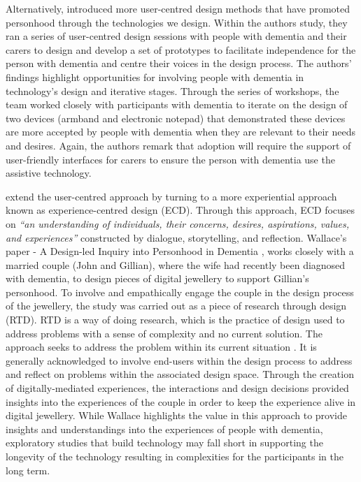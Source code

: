 Alternatively, \cite{robinson2009keeping} introduced more user-centred design methods that have promoted personhood through the technologies we design. Within the authors study, they ran a series of user-centred design sessions with people with dementia and their carers to design and develop a set of prototypes to facilitate independence for the person with dementia and centre their voices in the design process. The authors' findings highlight opportunities for involving people with dementia in technology's design and iterative stages. Through the series of workshops, the team worked closely with participants with dementia to iterate on the design of two devices (armband and electronic notepad) that demonstrated these devices are more accepted by people with dementia when they are relevant to their needs and desires. Again, the authors  remark that adoption will require the support of user-friendly interfaces for carers to ensure the person with dementia use the assistive technology. 

\cite{wallace_design-led_2013} extend the user-centred approach by turning to a more experiential approach known as experience-centred design (ECD). Through this approach, ECD focuses on \textit{``an understanding of individuals, their concerns, desires, aspirations, values, and experiences''} \citep{morrissey_value_2017} constructed by dialogue, storytelling, and reflection. Wallace's paper - A Design-led Inquiry into Personhood in Dementia \citep{wallace_design-led_2013}, works closely with a married couple (John and Gillian), where the wife had recently been diagnosed with dementia, to design pieces of digital jewellery to support Gillian's personhood. To involve and empathically engage the couple in the design process of the jewellery, the study was carried out as a piece of research through design (RTD). RTD is a way of doing research, which is the practice of design used to address problems with a sense of complexity and no current solution. The approach seeks to address the problem within its current situation \citep{zimmerman_research_2007}. It is generally acknowledged to involve end-users within the design process to address and reflect on problems within the associated design space. Through the creation of digitally-mediated experiences, the interactions and design decisions provided \cite{wallace_design-led_2013} insights into the experiences of the couple in order to keep the experience alive in digital jewellery. While Wallace highlights the value in this approach to provide insights and understandings into the experiences of people with dementia, exploratory studies that build technology may fall short in supporting the longevity of the technology resulting in complexities for the participants in the long term. 

